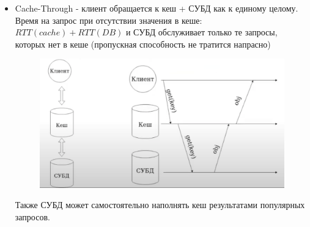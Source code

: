 \begin{itemize}
\begin{figure}[h]
            \caption{}
        \end{figure}
        \item Cache-Through - клиент обращается к кеш + СУБД как к единому целому. \\
        Время на запрос при отсутствии значения в кеше: $RTT(cache) + RTT(DB)$ и СУБД обслуживает только те запросы, которых нет в кеше (пропускная способность не тратится напрасно) \\
        \begin{figure}[h]
            \centering
            \includegraphics[scale = 0.5]{../assets/22.png}
            \caption{}
        \end{figure}
        Также СУБД может самостоятельно наполнять кеш результатами популярных запросов.
    \end{itemize}


